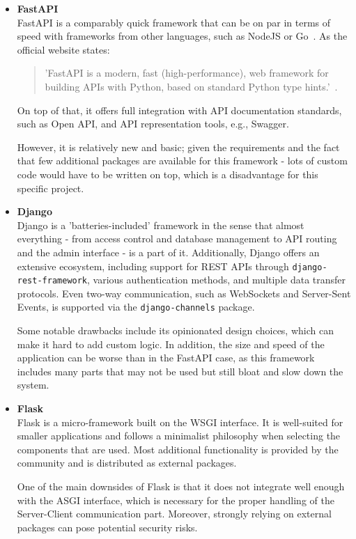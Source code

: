 \begin{itemize}
    \item \textbf{FastAPI} \\
    FastAPI is a comparably quick framework that can be on par in terms of speed with frameworks from other languages,
    such as NodeJS or Go~\cite{fastapi}.
    As the official website states:
    \begin{quote}
        'FastAPI is a modern, fast (high-performance), web framework for building APIs
        with Python, based on standard Python type hints.'~\cite{fastapi}. \\
    \end{quote}
    On top of that, it offers full integration with API documentation standards, such as
    Open API, and API representation tools, e.g., Swagger.

    However, it is relatively new and basic; given the requirements and the fact that
    few additional packages are available for this framework - lots of custom code would have
    to be written on top, which is a disadvantage for this specific project.

    \item \textbf{Django} \\
    Django is a 'batteries-included' framework in the sense that almost everything -
    from access control and database management to API routing and the admin interface -
    is a part of it.\cite{django}
    Additionally, Django offers an extensive ecosystem, including support for REST APIs through
    \texttt{django-rest-framework}\cite{drf}, various authentication methods,
    and multiple data transfer protocols. Even two-way communication, such as WebSockets and Server-Sent Events,
    is supported via the \texttt{django-channels}\cite{django_channels} package.

    Some notable drawbacks include its opinionated design choices, which can make it hard to add custom logic.
    In addition, the size and speed of the application can be worse than in the FastAPI case,
    as this framework includes many parts that may not be used but still bloat and slow down the system.

    \item \textbf{Flask} \\
    Flask is a micro-framework built on the WSGI interface.
    It is well-suited for smaller applications and follows a minimalist philosophy
    when selecting the components that are used.\cite{flask} Most additional functionality is provided by
    the community and is distributed as external packages.

    One of the main downsides of Flask is that it does not integrate well enough with the ASGI
    interface, which is necessary for the proper handling of the Server-Client communication part.
    Moreover, strongly relying on external packages can pose potential security risks.
\end{itemize}

